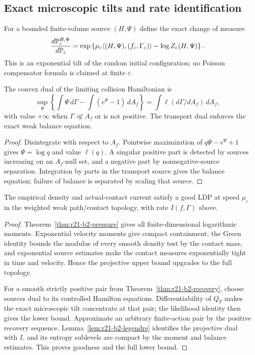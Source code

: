 \subsection{Exact microscopic tilts and rate identification}

For a bounded finite-volume source $(H,\Psi)$ define the exact change of
measure
\[
 {d\mathbb P_\varepsilon^{H,\Psi}\over d\mathbb P_\varepsilon}
 =\exp\left\{\mu_\varepsilon
 \langle(H,\Psi),(f_\varepsilon,\Gamma_\varepsilon)\rangle
 -\log Z_\varepsilon(H,\Psi)\right\}.
\]
This is an exponential tilt of the random initial configuration; no Poisson
compensator formula is claimed at finite $\varepsilon$.

\begin{lemma}
\label{lem:r21-b2-legendre}
The convex dual of the limiting collision Hamiltonian is
\[
 \sup_\Psi\left\{\int\Psi\,d\Gamma-
 \int(e^\Psi-1)\,dA_f\right\}
 =\int\ell(d\Gamma/dA_f)\,dA_f,
\]
with value $+\infty$ when $\Gamma\not\ll A_f$ or is not positive.  The
transport dual enforces the exact weak balance equation.
\end{lemma}

\begin{proof}
Disintegrate with respect to $A_f$.  Pointwise maximization of
$q\Psi-e^\Psi+1$ gives $\Psi=\log q$ and value $\ell(q)$.  A singular positive
part is detected by sources increasing on an $A_f$-null set, and a negative
part by nonnegative-source separation.  Integration by parts in the transport
source gives the balance equation; failure of balance is separated by scaling
that source.
\end{proof}

\begin{theorem}
\label{thm:r21-b2-gc}
The empirical density and actual-contact current satisfy a good LDP at speed
$\mu_\varepsilon$ in the weighted weak path/contact topology, with rate
$I(f,\Gamma)$ above.
\end{theorem}

\begin{proof}
Theorem~\ref{thm:r21-b2-pressure} gives all finite-dimensional logarithmic
moments.  Exponential velocity moments give compact containment; the Green
identity bounds the modulus of every smooth density test by the contact mass,
and exponential source estimates make the contact measures exponentially
tight in time and velocity.  Hence the projective upper bound upgrades to the
full topology.

For a smooth strictly positive pair from
Theorem~\ref{thm:r21-b2-recovery}, choose sources dual to its controlled
Hamilton equations.  Differentiability of $Q_T$ makes the exact microscopic
tilt concentrate at that pair; the likelihood identity then gives the lower
bound.  Approximate an arbitrary finite-action pair by the positive recovery
sequence.  Lemma~\ref{lem:r21-b2-legendre} identifies the projective dual with
$I$, and its entropy sublevels are compact by the moment and balance estimates.
This proves goodness and the full lower bound.
\end{proof}

